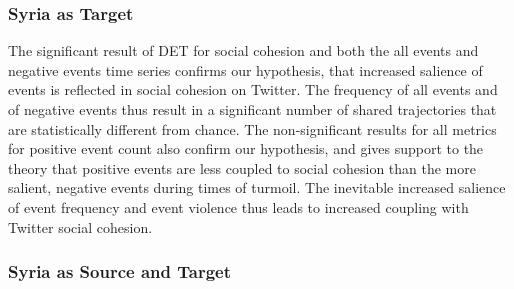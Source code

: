 \documentclass[english,man]{apa6}
\begin{document}
\hypertarget{syria-as-target-2}{%
\subsubsection{Syria as Target}\label{syria-as-target-2}}

The significant result of DET for social cohesion and both the all events and negative events time series confirms our hypothesis, that increased salience of events is reflected in social cohesion on Twitter. The frequency of all events and of negative events thus result in a significant number of shared trajectories that are statistically different from chance. The non-significant results for all metrics for positive event count also confirm our hypothesis, and gives support to the theory that positive events are less coupled to social cohesion than the more salient, negative events during times of turmoil. The inevitable increased salience of event frequency and event violence thus leads to increased coupling with Twitter social cohesion.

\hypertarget{syria-as-source-and-target-2}{%
\subsubsection{Syria as Source and Target}\label{syria-as-source-and-target-2}}
\end{document}
